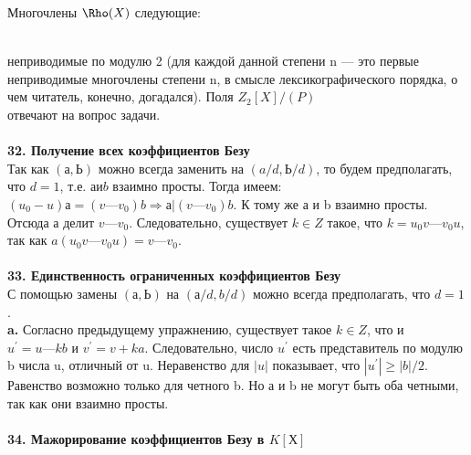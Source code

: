 \documentclass{book}
\begin{document}
Многочлены $\Rho(X)$ следующие:\\
\\
			\begin{array}{llll}
			$X^2 + X + 1$, & $X^3 + X + 1$, & $X^4} + X + 1$,\\ 

			        &$X^5 + X^2 + 1$, & $X^6 + X + 1$, & $X^7 + X + 1$,\\ 
			\end{array}
\newpage
неприводимые по модулю 2 (для каждой данной степени n --- это 
первые неприводимые многочлены степени n, в смысле лексикографического 
порядка, о чем читатель, конечно, догадался). Поля $Z_2[X]/(P)$\\
отвечают на вопрос задачи.\\
\\
\textbf{32. Получение всех коэффициентов Безу}
\\

Так как $(а, Ь)$ можно всегда заменить на $(a/d, Ь/d)$, то будем предполагать,
что $d = 1$, т.е. $а и b$ взаимно просты. Тогда имеем: $(u_0 - u)а =
(v — v_0)b \Rightarrow а | (v — v_0)b$. К тому же а и b взаимно просты. Отсюда а
делит $v — v_0$. Следовательно, существует $k \in Z$ такое, что $k = u_0v — v_0u$,
так как $a(u_0v — v_0u) = v — v_0$.\\
\\
\textbf{33. Единственность ограниченных коэффициентов Безу}\\

С помощью замены $(а, Ь)$ на $(а/d, b/d)$ можно всегда предполагать,
что $d = 1$.\\

\textbf{a.} Согласно предыдущему упражнению, существует такое $k \in Z$,
что и $u^{'} = u — kb$ и $v^{'} = v+ka$. Следовательно, число $u^'$ есть представитель
по модулю b числа u, отличный от u. Неравенство для $|u|$ показывает,
что $|u^{'}| \geq |b|/2$. Равенство возможно только для четного b. Но а и b не
могут быть оба четными, так как они взаимно просты.\\
\\

\textbf{34. Мажорирование коэффициентов Безу в $K[Х]$}\\
\end{document}
